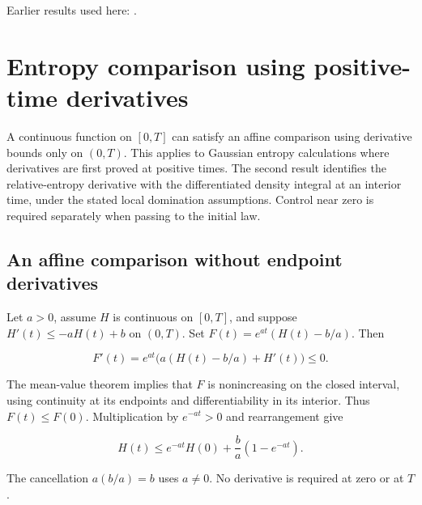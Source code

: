 \documentclass[11pt,a4paper]{report}
\begin{document}
Earlier results used here: \cite[Section~3.26.3]{LangevinLean2026ULASC}.
\section{\texorpdfstring{Entropy comparison using positive-time derivatives}{Entropy comparison using positive-time derivatives}}
\label{proof-module-UnadjustedLangevin-LSI-InteriorEntropy-lean}


A continuous function on \([0,T]\) can satisfy an affine comparison using derivative bounds only on \((0,T)\). This applies to Gaussian entropy calculations where derivatives are first proved at positive times. The second result identifies the relative-entropy derivative with the differentiated density integral at an interior time, under the stated local domination assumptions. Control near zero is required separately when passing to the initial law.

\subsection{\texorpdfstring{An affine comparison without endpoint derivatives}{An affine comparison without endpoint derivatives}}
\label{report-step-UnadjustedLangevin-LSI-InteriorEntropy-lean-1}


Let \(a>0\), assume \(H\) is continuous on \([0,T]\), and suppose \(H'(t)\le-aH(t)+b\) on \((0,T)\). Set \(F(t)=e^{at}(H(t)-b/a)\). Then

\[F'(t)=e^{at}\bigl(a(H(t)-b/a)+H'(t)\bigr)\le0.\]

The mean-value theorem implies that \(F\) is nonincreasing on the closed interval, using continuity at its endpoints and differentiability in its interior. Thus \(F(t)\le F(0)\). Multiplication by \(e^{-at}>0\) and rearrangement give

\[H(t)\le e^{-at}H(0)+\frac ba(1-e^{-at}).\]

The cancellation \(a(b/a)=b\) uses \(a\ne0\). No derivative is required at zero or at \(T\).
\end{document}
